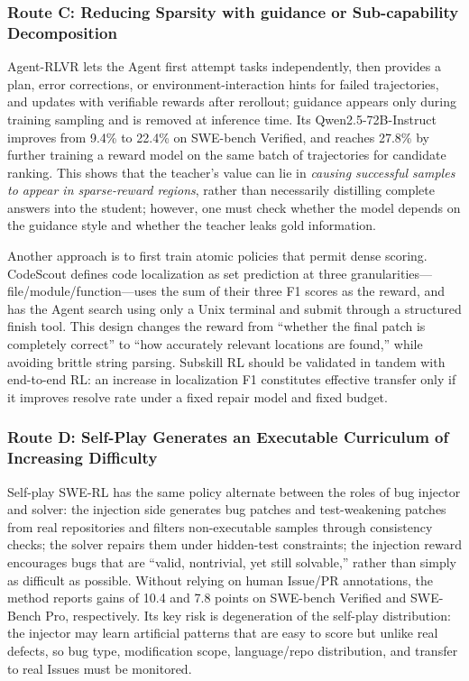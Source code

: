 \documentclass[10pt,a4paper,UTF8,fontset=none]{ctexart}
\begin{document}
\subsubsection{Route C: Reducing Sparsity with guidance or Sub-capability Decomposition}

Agent-RLVR lets the Agent first attempt tasks independently, then provides a plan, error corrections, or environment-interaction hints for failed trajectories, and updates with verifiable rewards after rerollout; guidance appears only during training sampling and is removed at inference time\cite{en:da2025agentrlvr}. Its Qwen2.5-72B-Instruct improves from 9.4\% to 22.4\% on SWE-bench Verified, and reaches 27.8\% by further training a reward model on the same batch of trajectories for candidate ranking. This shows that the teacher's value can lie in \emph{causing successful samples to appear in sparse-reward regions}, rather than necessarily distilling complete answers into the student; however, one must check whether the model depends on the guidance style and whether the teacher leaks gold information.

Another approach is to first train atomic policies that permit dense scoring. CodeScout defines code localization as set prediction at three granularities---file/module/function---uses the sum of their three F1 scores as the reward, and has the Agent search using only a Unix terminal and submit through a structured finish tool\cite{en:sutawika2026codescout}. This design changes the reward from ``whether the final patch is completely correct'' to ``how accurately relevant locations are found,'' while avoiding brittle string parsing. Subskill RL should be validated in tandem with end-to-end RL: an increase in localization F1 constitutes effective transfer only if it improves resolve rate under a fixed repair model and fixed budget.

\subsubsection{Route D: Self-Play Generates an Executable Curriculum of Increasing Difficulty}

Self-play SWE-RL has the same policy alternate between the roles of bug injector and solver: the injection side generates bug patches and test-weakening patches from real repositories and filters non-executable samples through consistency checks; the solver repairs them under hidden-test constraints; the injection reward encourages bugs that are ``valid, nontrivial, yet still solvable,'' rather than simply as difficult as possible\cite{en:wei2025selfplay}. Without relying on human Issue/PR annotations, the method reports gains of 10.4 and 7.8 points on SWE-bench Verified and SWE-Bench Pro, respectively. Its key risk is degeneration of the self-play distribution: the injector may learn artificial patterns that are easy to score but unlike real defects, so bug type, modification scope, language/repo distribution, and transfer to real Issues must be monitored.
\end{document}
